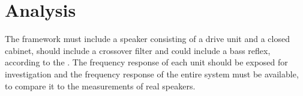 \section{Analysis}
The framework must include a speaker consisting of a drive unit and a closed cabinet, should include a crossover filter and could include a bass reflex, according to the .
The frequency response of each unit should be exposed 
for investigation and the frequency response of the entire system must be available, to compare it to the measurements of real speakers.